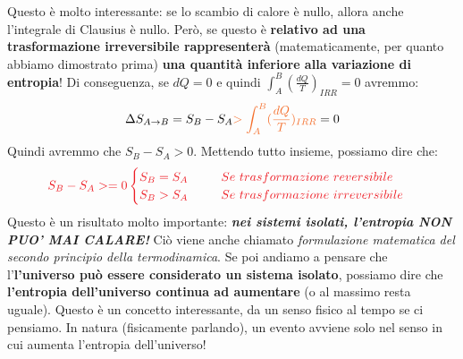                 Questo è molto interessante: se lo scambio di calore è nullo, allora anche l'integrale di Clausius è nullo. Però, se questo è \textbf{relativo ad una trasformazione irreversibile rappresenterà} (matematicamente, per quanto abbiamo dimostrato prima) \textbf{una quantità inferiore alla variazione di entropia}! Di conseguenza, se $dQ = 0$ e quindi $\int_A^B (\frac{dQ}{T})_{IRR} = 0$ avremmo:
                \begin{align*}
                    \Delta S_{A\rightarrow B} = S_B-S_A \textcolor{Orange}{>\int_A^B (\frac{dQ}{T})_{IRR}} = 0
                \end{align*}
                Quindi avremmo che $S_B-S_A > 0$. Mettendo tutto insieme, possiamo dire che:
                \begin{align*}
                    \textcolor{Red}{S_B-S_A >= 0
                    \begin{cases}
                        S_B = S_A \ \ \ \ \ \ \ \ Se\ trasformazione\ reversibile\\
                        S_B > S_A \ \ \ \ \ \ \ \ Se\ trasformazione\ irreversibile
                    \end{cases}}
                \end{align*}
                Questo è un risultato molto importante: \textbf{\textit{nei sistemi isolati, l'entropia NON PUO' MAI CALARE!}} Ciò viene anche chiamato \textit{formulazione matematica del secondo principio della termodinamica}. Se poi andiamo a pensare che l'\textbf{l'universo può essere considerato un sistema isolato}, possiamo dire che \textbf{l'entropia dell'universo continua ad aumentare} (o al massimo resta uguale). Questo è un concetto interessante, da un senso fisico al tempo se ci pensiamo. In natura (fisicamente parlando), un evento avviene solo nel senso in cui aumenta l'entropia dell'universo!

